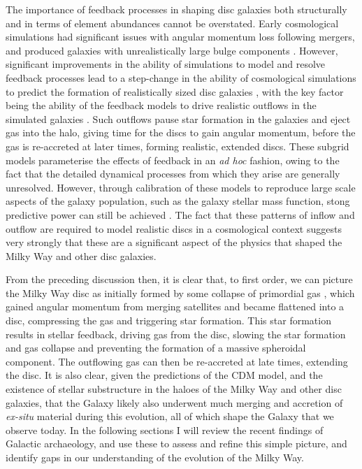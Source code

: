 The importance of feedback processes in shaping disc galaxies both structurally and in terms of element abundances cannot be overstated. Early cosmological simulations had significant issues with angular momentum loss following mergers, and produced galaxies with unrealistically large bulge components \citep[this became known as the `angular momentum catastrophe' e.g.][]{1994MNRAS.267..401N}. However, significant improvements in the ability of simulations to model and resolve feedback processes lead to a step-change in the ability of cosmological simulations to predict the formation of realistically sized disc galaxies \citep[e.g.][among many others]{2011ApJ...742...76G,2012MNRAS.426..690B,2012MNRAS.427..379M,2013MNRAS.436..625S,2014MNRAS.445..581H,2014MNRAS.442.2474M,2014MNRAS.443.2452M}, with the key factor being the ability of the feedback models to drive realistic outflows in the simulated galaxies \citep[e.g.][]{2008MNRAS.387.1431D,2008MNRAS.389.1137S}. Such outflows pause star formation in the galaxies and eject gas into the halo, giving time for the discs to gain angular momentum, before the gas is re-accreted at later times, forming realistic, extended discs. These subgrid models parameterise the effects of feedback in an \emph{ad hoc} fashion, owing to the fact that the detailed dynamical processes from which they arise are generally unresolved. However, through calibration of these models to reproduce large scale aspects of the galaxy population, such as the galaxy stellar mass function, stong predictive power can still be achieved \citep[good discussions of this are given in][]{2015MNRAS.446..521S,2015MNRAS.450.1937C}. The fact that these patterns of inflow and outflow are required to model realistic discs in a cosmological context suggests very strongly that these are a significant aspect of the physics that shaped the Milky Way and other disc galaxies.

From the preceding discussion then, it is clear that, to first order, we can picture the Milky Way disc as initially formed by some collapse of primordial gas \citep[as in][]{1962ApJ...136..748E}, which gained angular momentum from merging satellites \citep[e.g.][]{1978ApJ...225..357S} and became flattened into a disc, compressing the gas and triggering star formation. This star formation results in stellar feedback, driving gas from the disc, slowing the star formation and gas collapse and preventing the formation of a massive spheroidal component. The outflowing gas can then be re-accreted at late times, extending the disc. It is also clear, given the predictions of the CDM model, and the existence of stellar substructure in the haloes of the Milky Way and other disc galaxies, that the Galaxy likely also underwent much merging and accretion of \emph{ex-situ} material during this evolution, all of which shape the Galaxy that we observe today. In the following sections I will review the recent findings of Galactic archaeology, and use these to assess and refine this simple picture, and identify gaps in our understanding of the evolution of the Milky Way.

